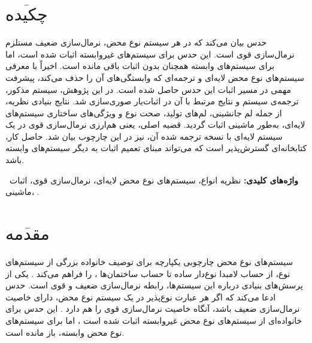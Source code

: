 \documentclass[11pt,twocolumn,a4paper,twoside]{article}
\makeatletter
\def\@makefnmark{\hbox{\@textsuperscript{\@thefnmark}}}
\renewcommand\@makefntext[1]{%
\let\@textsuperscript\relax    \parindent 1em%
    \noindent
    \hb@xt@0.8em{\hss\@makefnmark}\ {\scriptsize #1}}
\newcommand{\keyword}[1]{\textbf{واژه‌های کلیدی:} #1}
\theoremstyle{definition}
\theoremstyle{theorem}
\theoremstyle{definition}
\theoremstyle{definition}
\theoremstyle{definition}
\theoremstyle{definition}
\theoremstyle{definition}
\makeatother
\begin{document}
\makeatletter
\def\@makefnmark{\hbox{\scriptsize\@textsuperscript{\@thefnmark}}}
\renewcommand\@makefntext[1]{%
\let\@textsuperscript\relax    \parindent 1em%
    \noindent
    \hb@xt@0.8em{\hss\@makefnmark-}\ {\scriptsize #1}}
\makeatother

\section*{$\overline{\text{
چکیده
}}$}

حدس   بیان می‌کند که در هر سیستم نوع محض، نرمال‌سازی ضعیف مستلزم نرمال‌سازی قوی است. این حدس برای سیستم‌های غیروابسته اثبات شده است، اما برای سیستم‌های وابسته همچنان بدون اثبات باقی مانده است. اخیراً با معرفی سیستم‌های نوع محض لایه‌ای و ترجمه‌ای که وابستگی‌های آن را حذف می‌کند، پیشرفت مهمی در مسیر اثبات این حدس حاصل شده است. در این پژوهش، سیستم مذکور، ترجمه‌ی سیستم و نتایج مرتبط با آن در اثبات‌یار  صوری‌سازی شد. نتایج بنیادی نظریه، از جمله لم جانشینی، لم‌های تولید، صحت نوع و ویژگی‌های ساختاری سیستم‌های لایه‌ای، به‌طور ماشینی اثبات گردید. قضیه اصلی، یعنی هم‌ارزی نرمال‌سازی قوی در یک سیستم لایه‌ای با نسخه ترجمه شده آن، نیز در این چارچوب بیان شد. حاصل کار، کتابخانه‌ای گسترش‌پذیر است که می‌تواند مبنای تعمیم اثبات به دیگر سیستم‌های وابسته‌ باشد.

~\keyword{نظریه انواع، سیستم‌های نوع محض لایه‌ای، نرمال‌سازی قوی، اثبات ماشینی، \lr{Rocq}. }

\section{$\overline{\text{
مقدمه
}}$}
سیستم‌های نوع محض  چارچوبی یکپارچه برای توصیف خانواده بزرگی از سیستم‌های نوع، از حساب لامبدا نوع‌دار ساده  تا حساب ساختمان‌ها ، را فراهم می‌کند \cite{barendregt, barendregt1991}.
یکی از پرسش‌های بنیادی درباره این سیستم‌ها، رابطه نرمال‌سازی ضعیف و قوی است. حدس  ادعا می‌کند که اگر هر عبارت نوع‌پذیر در یک سیستم نوع محض، دارای خاصیت نرمال‌سازی ضعیف باشد، آنگاه خاصیت نرمال‌سازی قوی را هم دارد \cite{geuvers1993}.
این حدس برای خانواده‌ای از سیستم‌های نوع محض غیروابسته اثبات شده است \cite{barthe2001}، اما برای سیستم‌های نوع محض وابسته، باز مانده است.
\end{document}
